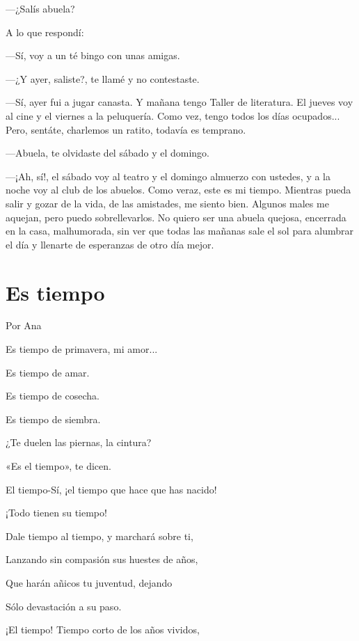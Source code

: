 \documentclass[11pt,twoside,openright,a5paper]{book}
\begin{document}
---¿Salís abuela?

A lo que respondí: 

---Sí, voy a un té bingo con unas amigas.

---¿Y ayer, saliste?, te llamé y no contestaste.

---Sí, ayer fui a jugar canasta. Y mañana tengo Taller de literatura. El jueves voy al cine y el viernes a la peluquería. Como vez, tengo todos los días ocupados... Pero, sentáte, charlemos un ratito, todavía es temprano.

---Abuela, te olvidaste del sábado y el domingo.

---¡Ah, sí!, el sábado voy al teatro y el domingo almuerzo con ustedes, y a la noche voy al club de los abuelos. Como veraz, este es mi tiempo. Mientras pueda salir y gozar de la vida, de las amistades, me siento bien. Algunos males me aquejan, pero puedo sobrellevarlos. No quiero ser una abuela quejosa, encerrada en la casa, malhumorada, sin ver que todas las mañanas sale el sol para alumbrar el día y llenarte de esperanzas de otro día mejor.

\section*{Es tiempo}
                                                                                                        \begin{flushright}Por Ana\end{flushright}

Es tiempo de primavera, mi amor...

Es tiempo de amar.

Es tiempo de cosecha.

Es tiempo de siembra.

¿Te duelen las piernas, la cintura?

«Es el tiempo», te dicen.

El tiempo-Sí, ¡el tiempo que hace que has nacido!

¡Todo tienen su tiempo!

Dale tiempo al tiempo, y marchará sobre ti, 

Lanzando sin compasión sus huestes de años,

Que harán añicos tu juventud, dejando

Sólo devastación a su paso.

¡El tiempo! Tiempo corto de los años vividos,
\end{document}
